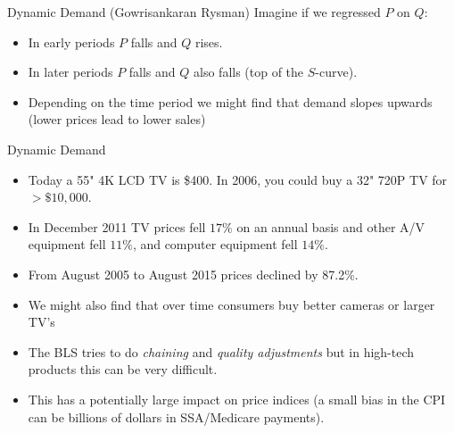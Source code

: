 \begin{frame}{Dynamic Demand (Gowrisankaran Rysman)}
Imagine if we regressed $P$ on $Q$:
\begin{itemize}
\item In early periods $P$ falls and $Q$ rises.
\item In later periods $P$ falls and $Q$ also falls (top of the $S$-curve).
\item Depending on the time period we might find that demand slopes \alert{upwards} (lower prices lead to lower sales)
\end{itemize}
\end{frame}



%

\begin{frame}{Dynamic Demand}
\begin{itemize}
\item Today a 55" 4K LCD TV is \$400. In 2006, you could buy a 32" 720P TV for $>\$10,000$.
\item In December 2011 TV prices fell $17\%$ on an annual basis and other A/V equipment fell $11\%$, and computer equipment fell $14\%$.
\item From August 2005 to August 2015 prices declined by 87.2\%.
\item We might also find that over time consumers buy better cameras or larger TV's
\item The BLS tries to do \textit{chaining} and \textit{quality adjustments} but in high-tech products this can be very difficult.
\item This has a potentially large impact on price indices (a small bias in the CPI can be billions of dollars in SSA/Medicare payments).
\end{itemize}
\end{frame}



